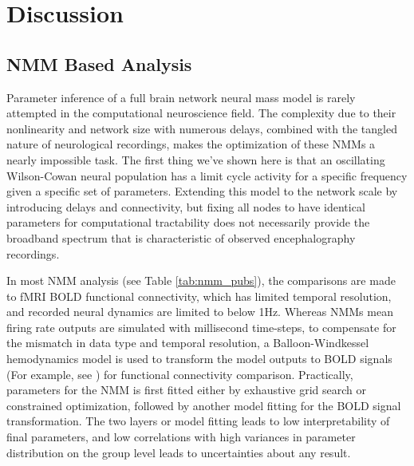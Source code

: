 \section{Discussion}
\subsection{NMM Based Analysis}
Parameter inference of a full brain network neural mass model is rarely attempted in the computational neuroscience field. The complexity due to their nonlinearity and network size with numerous delays, combined with the tangled nature of neurological recordings, makes the optimization of these NMMs a nearly impossible task. The first thing we've shown here is that an oscillating Wilson-Cowan neural population has a limit cycle activity for a specific frequency given a specific set of parameters. Extending this model to the network scale by introducing delays and connectivity, but fixing all nodes to have identical parameters for computational tractability does not necessarily provide the broadband spectrum that is characteristic of observed encephalography recordings.

In most NMM analysis (see Table \ref{tab:nmm_pubs}), the comparisons are made to fMRI BOLD functional connectivity, which has limited temporal resolution, and recorded neural dynamics are limited to below 1Hz. Whereas NMMs mean firing rate outputs are simulated with millisecond time-steps, to compensate for the mismatch in data type and temporal resolution, a Balloon-Windkessel hemodynamics model \cite{friston_nonlinear_2000, deco_resting-state_2013} is used to transform the model outputs to BOLD signals (For example, see \cite{deco_resting-state_2013, deco_how_2014}) for functional connectivity comparison. Practically, parameters for the NMM is first fitted either by exhaustive grid search or constrained optimization, followed by another model fitting for the BOLD signal transformation. The two layers or model fitting leads to low interpretability of final parameters, and low correlations with high variances in parameter distribution on the group level leads to uncertainties about any result.

